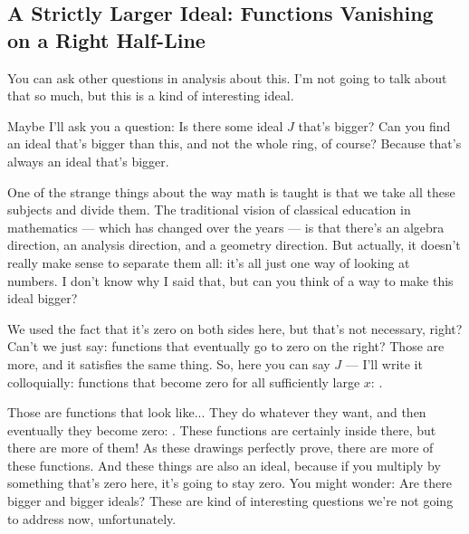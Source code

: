 \subsection{A Strictly Larger Ideal: Functions Vanishing on a Right Half-Line}

\begin{speech}[01:01:30 - 01:03:45]
You can ask other questions in analysis about this. I'm not going to talk about that so much, but this is a kind of interesting ideal.

Maybe I'll ask you a question: Is there some ideal $J$ that's bigger?  Can you find an ideal that's bigger than this, and not the whole ring, of course? Because that's always an ideal that's bigger.

One of the strange things about the way math is taught is that we take all these subjects and divide them. The traditional vision of classical education in mathematics --- which has changed over the years --- is that there's an algebra direction, an analysis direction, and a geometry direction. But actually, it doesn't really make sense to separate them all: it's all just one way of looking at numbers. I don't know why I said that, but can you think of a way to make this ideal bigger?

We used the fact that it's zero on both sides here, but that's not necessary, right? Can't we just say: functions that eventually go to zero on the right? Those are more, and it satisfies the same thing. So, here you can say $J$ --- I'll write it colloquially: functions that become zero for all sufficiently large $x$: .

Those are functions that look like... They do whatever they want, and then eventually they become zero: . These functions are certainly inside there, but there are more of them! As these drawings perfectly prove, there are more of these functions. And these things are also an ideal, because if you multiply by something that's zero here, it's going to stay zero. You might wonder: Are there bigger and bigger ideals? These are kind of interesting questions we're not going to address now, unfortunately.
\end{speech}

